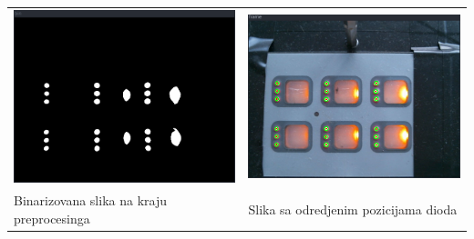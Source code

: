 \documentclass[a4paper,12pt, projekat]{etf}
\begin{document}
        \begin{table}[h!]
            \begin{tabular}{ll}
                \includegraphics[scale=0.3]{bin.png} &
                \includegraphics[scale=0.3]{hough.png} \\
                Binarizovana slika na kraju preprocesinga &
                Slika sa odredjenim pozicijama dioda
            \end{tabular}
        \end{table}
\end{document}
